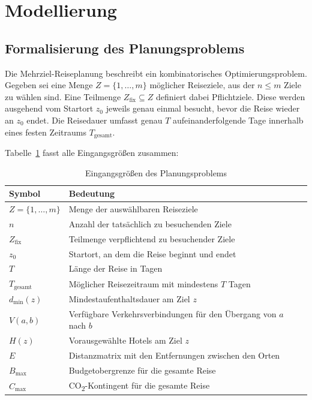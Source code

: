 \section{Modellierung}
\label{sec:modellierung}

\subsection{Formalisierung des Planungsproblems}
\label{subsec:formalisierung}

Die Mehrziel-Reiseplanung beschreibt ein kombinatorisches Optimierungsproblem. Gegeben sei eine Menge $Z = \{1, \dots, m\}$ möglicher Reiseziele, aus der $n \leq m$ Ziele zu wählen sind. Eine Teilmenge $Z_{\text{fix}} \subseteq Z$ definiert dabei Pflichtziele. Diese werden ausgehend vom Startort $z_0$ jeweils genau einmal besucht, bevor die Reise wieder an $z_0$ endet. Die Reisedauer umfasst genau $T$ aufeinanderfolgende Tage innerhalb eines festen Zeitraums $T_{\text{gesamt}}$.

Tabelle~\ref{tab:eingangsgroessen} fasst alle Eingangsgrößen zusammen:

\begin{table}[H]
  \centering
  \begin{tabular}{@{}lp{10.5cm}@{}}
    \toprule
    Symbol & Bedeutung \\
    \midrule
    $Z = \{1,\dots,m\}$ & Menge der auswählbaren Reiseziele \\
    $n$ & Anzahl der tatsächlich zu besuchenden Ziele \\
    $Z_{\text{fix}}$ & Teilmenge verpflichtend zu besuchender Ziele \\
    $z_0$ & Startort, an dem die Reise beginnt und endet \\
    $T$ & Länge der Reise in Tagen \\
    $T_{\text{gesamt}}$ & Möglicher Reisezeitraum mit mindestens $T$ Tagen \\
    $d_{\min}(z)$ & Mindestaufenthaltsdauer am Ziel $z$ \\
    $V(a,b)$ & Verfügbare Verkehrsverbindungen für den Übergang von $a$ nach $b$ \\
    $H(z)$ & Vorausgewählte Hotels am Ziel $z$ \\
    $E$ & Distanzmatrix mit den Entfernungen zwischen den Orten \\
    $B_{\max}$ & Budgetobergrenze für die gesamte Reise \\
    $C_{\max}$ & CO\textsubscript{2}-Kontingent für die gesamte Reise \\
    \bottomrule
  \end{tabular}
  \caption{Eingangsgrößen des Planungsproblems}
  \label{tab:eingangsgroessen}
\end{table}

